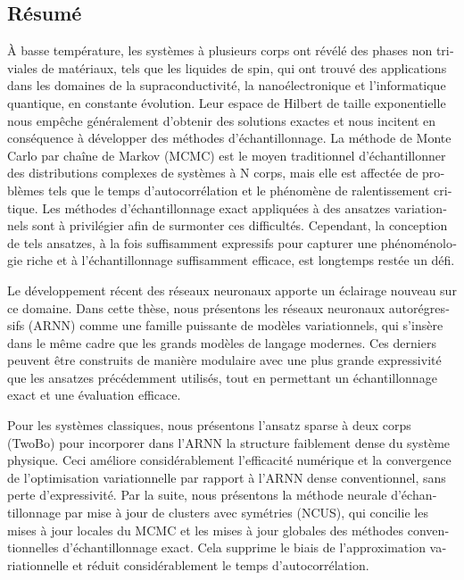 \begin{otherlanguage}{french}
\cleardoublepage
\chapter*{Résumé}

À basse température, les systèmes à plusieurs corps ont révélé des phases non triviales de matériaux, tels que les liquides de spin, qui ont trouvé des applications dans les domaines de la supraconductivité, la nanoélectronique et l'informatique quantique, en constante évolution. Leur espace de Hilbert de taille exponentielle nous empêche généralement d'obtenir des solutions exactes et nous incitent en conséquence à développer des méthodes d'échantillonnage. La méthode de Monte Carlo par chaîne de Markov (MCMC) est le moyen traditionnel d'échantillonner des distributions complexes de systèmes à N corps, mais elle est affectée de problèmes tels que le temps d'autocorrélation et le phénomène de ralentissement critique. Les méthodes d'échantillonnage exact appliquées à des ansatzes variationnels sont à privilégier afin de surmonter ces difficultés. Cependant, la conception de tels ansatzes, à la fois suffisamment expressifs pour capturer une phénoménologie riche et à l'échantillonnage suffisamment efficace, est longtemps restée un défi.

Le développement récent des réseaux neuronaux apporte un éclairage nouveau sur ce domaine. Dans cette thèse, nous présentons les réseaux neuronaux autorégressifs (ARNN) comme une famille puissante de modèles variationnels, qui s'insère dans le même cadre que les grands modèles de langage modernes. Ces derniers peuvent être construits de manière modulaire avec une plus grande expressivité que les ansatzes précédemment utilisés, tout en permettant un échantillonnage exact et une évaluation efficace.

Pour les systèmes classiques, nous présentons l'ansatz sparse à deux corps (TwoBo) pour incorporer dans l'ARNN la structure faiblement dense du système physique. Ceci améliore considérablement l'efficacité numérique et la convergence de l'optimisation variationnelle par rapport à l'ARNN dense conventionnel, sans perte d'expressivité. Par la suite, nous présentons la méthode neurale d'échantillonnage par mise à jour de clusters avec symétries (NCUS), qui concilie les mises à jour locales du MCMC et les mises à jour globales des méthodes conventionnelles d'échantillonnage exact. Cela supprime le biais de l'approximation variationnelle et réduit considérablement le temps d'autocorrélation.


\end{otherlanguage}
